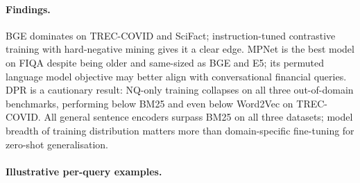 \documentclass[12pt, a4paper]{article}
\newcommand{\tc}{TREC-COVID}
\newcommand{\fiqa}{FIQA}
\newcommand{\scifact}{SciFact}
\begin{document}
\paragraph{Findings.}
BGE dominates on \tc{} and \scifact{}; instruction-tuned contrastive
training with hard-negative mining gives it a clear edge.  MPNet is the best
model on \fiqa{} despite being older and same-sized as BGE and E5; its
permuted language model objective may better align with conversational
financial queries.  DPR is a cautionary result: NQ-only training collapses
on all three out-of-domain benchmarks, performing below BM25 and even below
Word2Vec on \tc{}.  All general sentence encoders surpass BM25 on all three
datasets; model breadth of training distribution matters more than
domain-specific fine-tuning for zero-shot generalisation.

\paragraph{Illustrative per-query examples.}
\end{document}
